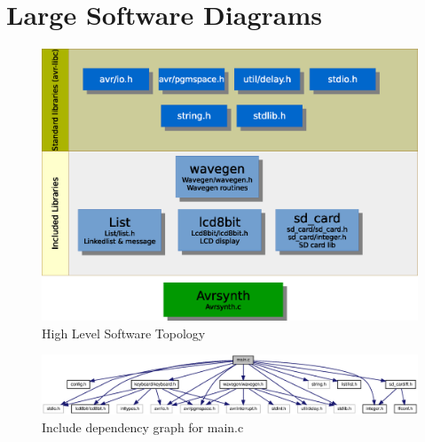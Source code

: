 \documentclass[bibtotocnumbered,abstract=on,paper=a4,fontsize=12pt,parskip=on,halfparskip=on]{scrartcl}		%
\begin{document}
\section{Large Software Diagrams}
    \begin{figure}[H]
      \centering
        \includegraphics[width=\linewidth]{img/fig_soft_diag}
        \caption{High Level Software Topology}
    \end{figure}
    \begin{figure}[H]
      \centering
        \includegraphics[width=\linewidth]{img/main_8c_incl.eps}
        \caption{Include dependency graph for main.c}
    \end{figure}
\end{document}
